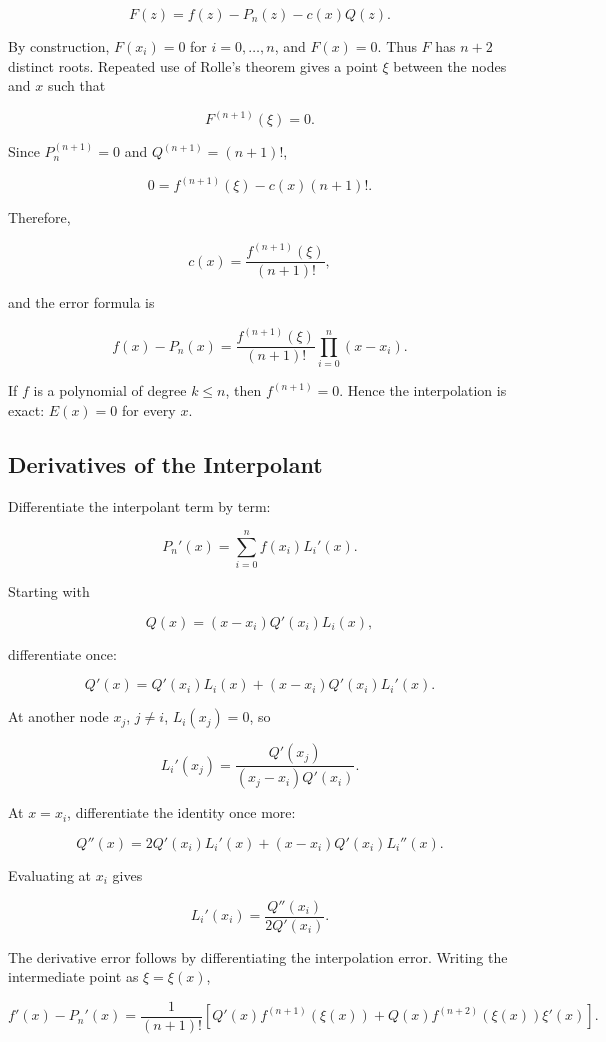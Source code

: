 \documentclass[12pt, a4paper]{article}
\theoremstyle{break}
\begin{document}
\[
F(z)=f(z)-P_n(z)-c(x)Q(z).
\]

By construction, \(F(x_i)=0\) for \(i=0,\ldots,n\), and \(F(x)=0\). Thus \(F\) has \(n+2\) distinct roots. Repeated use of Rolle's theorem gives a point \(\xi\) between the nodes and \(x\) such that

\[
F^{(n+1)}(\xi)=0.
\]

Since \(P_n^{(n+1)}=0\) and \(Q^{(n+1)}=(n+1)!\),

\[
0=f^{(n+1)}(\xi)-c(x)(n+1)!.
\]

Therefore,

\[
c(x)=\frac{f^{(n+1)}(\xi)}{(n+1)!},
\]

and the error formula is

\[
\boxed{
f(x)-P_n(x)=\frac{f^{(n+1)}(\xi)}{(n+1)!}
\prod_{i=0}^n(x-x_i)
}.
\]

If \(f\) is a polynomial of degree \(k\le n\), then \(f^{(n+1)}=0\). Hence the interpolation is exact: \(E(x)=0\) for every \(x\).

\subsection{Derivatives of the Interpolant}\label{derivatives-of-the-interpolant}

Differentiate the interpolant term by term:

\[
P_n'(x)=\sum_{i=0}^n f(x_i)L_i'(x).
\]

Starting with

\[
Q(x)=(x-x_i)Q'(x_i)L_i(x),
\]

differentiate once:

\[
Q'(x)=Q'(x_i)L_i(x)+(x-x_i)Q'(x_i)L_i'(x).
\]

At another node \(x_j\), \(j\ne i\), \(L_i(x_j)=0\), so

\[
L_i'(x_j)=\frac{Q'(x_j)}{(x_j-x_i)Q'(x_i)}.
\]

At \(x=x_i\), differentiate the identity once more:

\[
Q''(x)=2Q'(x_i)L_i'(x)+(x-x_i)Q'(x_i)L_i''(x).
\]

Evaluating at \(x_i\) gives

\[
L_i'(x_i)=\frac{Q''(x_i)}{2Q'(x_i)}.
\]

The derivative error follows by differentiating the interpolation error. Writing the intermediate point as \(\xi=\xi(x)\),

\[
f'(x)-P_n'(x)=\frac{1}{(n+1)!}
\left[Q'(x)f^{(n+1)}(\xi(x))
+Q(x)f^{(n+2)}(\xi(x))\xi'(x)\right].
\]
\end{document}
